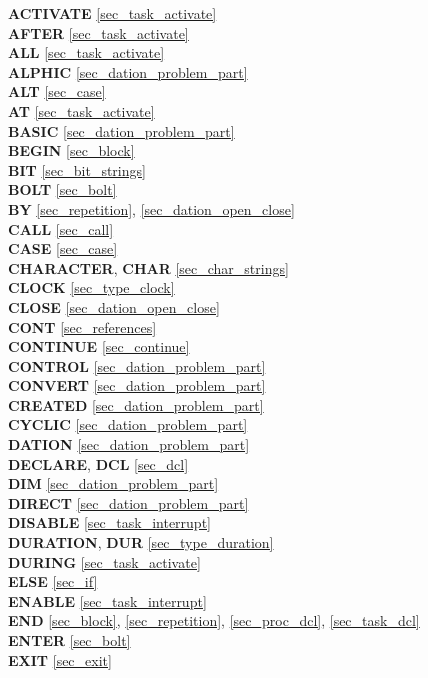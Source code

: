 {
{\bf ACTIVATE} \ref{sec_task_activate}\\
{\bf AFTER} \ref{sec_task_activate}\\
{\bf ALL} \ref{sec_task_activate}\\
{\bf ALPHIC} \ref{sec_dation_problem_part}\\
{\bf ALT} \ref{sec_case}\\
{\bf AT} \ref{sec_task_activate}\\

{\bf BASIC} \ref{sec_dation_problem_part}\\
{\bf BEGIN} \ref{sec_block} \\
{\bf BIT} \ref{sec_bit_strings}\\
{\bf BOLT} \ref{sec_bolt}\\
{\bf BY} \ref{sec_repetition}, \ref{sec_dation_open_close}\\

{\bf CALL} \ref{sec_call}\\
{\bf CASE} \ref{sec_case}\\
{\bf CHARACTER}, {\bf CHAR} \ref{sec_char_strings}\\
{\bf CLOCK} \ref{sec_type_clock}\\
{\bf CLOSE} \ref{sec_dation_open_close}\\
{\bf CONT} \ref{sec_references}\\
{\bf CONTINUE} \ref{sec_continue}\\
{\bf CONTROL} \ref{sec_dation_problem_part}\\
{\bf CONVERT} \ref{sec_dation_problem_part}\\
{\bf CREATED} \ref{sec_dation_problem_part}\\
{\bf CYCLIC} \ref{sec_dation_problem_part}\\
 
{\bf DATION} \ref{sec_dation_problem_part}\\
{\bf DECLARE}, {\bf DCL} \ref{sec_dcl}\\
{\bf DIM} \ref{sec_dation_problem_part}\\
{\bf DIRECT} \ref{sec_dation_problem_part}\\
{\bf DISABLE} \ref{sec_task_interrupt}\\
{\bf DURATION}, {\bf DUR} \ref{sec_type_duration}\\
{\bf DURING} \ref{sec_task_activate}\\

{\bf ELSE} \ref{sec_if}\\
{\bf ENABLE} \ref{sec_task_interrupt}\\
{\bf END} \ref{sec_block}, \ref{sec_repetition}, \ref{sec_proc_dcl},
	 \ref{sec_task_dcl}\\
{\bf ENTER} \ref{sec_bolt}\\
{\bf EXIT} \ref{sec_exit}\\

}
